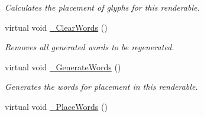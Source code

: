 \begin{DoxyCompactItemize}
\begin{DoxyCompactList}\small\item\em Calculates the placement of glyphs for this renderable. \item\end{DoxyCompactList}\item 
\hypertarget{classMezzanine_1_1UI_1_1MarkupText_a915b74c838551fcf261e34aa216a48a5}{
virtual void \hyperlink{classMezzanine_1_1UI_1_1MarkupText_a915b74c838551fcf261e34aa216a48a5}{\_\-ClearWords} ()}
\label{classMezzanine_1_1UI_1_1MarkupText_a915b74c838551fcf261e34aa216a48a5}

\begin{DoxyCompactList}\small\item\em Removes all generated words to be regenerated. \item\end{DoxyCompactList}\item 
\hypertarget{classMezzanine_1_1UI_1_1MarkupText_adae51af75cee943e0bcfcdf55c613a91}{
virtual void \hyperlink{classMezzanine_1_1UI_1_1MarkupText_adae51af75cee943e0bcfcdf55c613a91}{\_\-GenerateWords} ()}
\label{classMezzanine_1_1UI_1_1MarkupText_adae51af75cee943e0bcfcdf55c613a91}

\begin{DoxyCompactList}\small\item\em Generates the words for placement in this renderable. \item\end{DoxyCompactList}\item 
\hypertarget{classMezzanine_1_1UI_1_1MarkupText_ab9a351ade0ff05337ae10a1e4c4b8375}{
virtual void \hyperlink{classMezzanine_1_1UI_1_1MarkupText_ab9a351ade0ff05337ae10a1e4c4b8375}{\_\-PlaceWords} ()}
\label{classMezzanine_1_1UI_1_1MarkupText_ab9a351ade0ff05337ae10a1e4c4b8375}


\end{DoxyCompactItemize}
